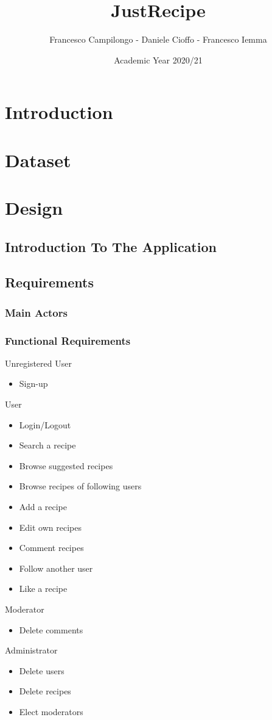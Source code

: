 \documentclass[a4paper]{report}
\begin{document}
\title{\Huge{JustRecipe}}
\author{\Large{Francesco Campilongo - Daniele Cioffo - Francesco Iemma}}
\date{Academic Year 2020/21}
\maketitle
\tableofcontents

\chapter*{Introduction}

\chapter{Dataset}


\chapter{Design}
\section{Introduction To The Application}
\section{Requirements}
\subsection{Main Actors}
\subsection{Functional Requirements}
Unregistered User
\begin{itemize}
	\item Sign-up
\end{itemize}
User
\begin{itemize}
	\item Login/Logout
	\item Search a recipe
	\item Browse suggested recipes
	\item Browse recipes of following users
	\item Add a recipe
	\item Edit own recipes
	\item Comment recipes
	\item Follow another user
	\item Like a recipe
\end{itemize}
Moderator
\begin{itemize}
	\item Delete comments
\end{itemize}
Administrator
\begin{itemize}
	\item Delete users
	\item Delete recipes
	\item Elect moderators
\end{itemize}
\end{document}
